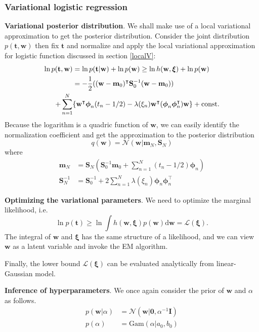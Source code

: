 \documentclass[a4paper]{report}
\newcommand{\ud}{\mathrm{d}}
\newcommand{\up}{\mathrm}
\renewcommand{\bf}{\mathbf}
\renewcommand{\cal}{\mathcal}
\newcommand{\bs}{\boldsymbol}
\begin{document}
\subsubsection{Variational logistic regression}
\textbf{Variational posterior distribution}. We shall make use of a local variational approximation to get the posterior distribution. Consider the joint distribution $p(\bf{t,w})$ then fix $\bf{t}$ and normalize and apply the local variational approximation for logistic function discussed in section \ref{localV}:
\begin{align}
	\ln p(\bf{t,w}) &= \ln p(\bf{t|w})+ \ln p(\bf{w}) \geq \ln h(\bf{w},\bs{\xi})+ \ln p(\bf{w}) \notag \\
	&= -\frac{1}{2}((\bf{w-m}_0)^{\intercal} \bf{S}_0^{-1} (\bf{w-m}_0)) \notag\\
	+\sum_{n=1}^N & \{ \bf{w}^{\intercal}\bs{\phi}_n (t_n-1/2)-\lambda(\xi_n)\bf{w}^{\intercal} (\bs{\phi}_n \bs{\phi}_n^{\intercal})\bf{w} \} +\up{const}.		
\end{align}
Because the logarithm is a quadric function of $\bf{w}$, we can easily identify the normalization coefficient and get the approximation to the posterior distribution
\begin{equation}
	q(\bf{w}) = \cal{N}(\bf{w}|\bf{m}_N,\bf{S}_N)
\end{equation}
where
\begin{align}
	\bf{m}_N &= \bf{S}_N \left( \bf{S}_0^{-1} \bf{m}_0 + \sum_{n=1}^N(t_n-1/2)\bs{\phi}_n \right)\\
	\bf{S}_N^{-1} &= \bf{S}_0^{-1} + 2\sum_{n=1}^N \lambda(\xi_n)\bs{\phi}_n \bs{\phi}_n^{\intercal}
\end{align}

\textbf{Optimizing the variational parameters}. We need to optimize the marginal likelihood, i.e.
\begin{equation}
	\ln p(\bf{t}) \geq \ln \int h(\bf{w},\bs{\xi})p(\bf{w})\ud \bf{w} = \cal{L}(\bs{\xi}).
\end{equation}
The integral of $\bf{w}$ and $\bs{\xi}$ has the same structure of a likelihood, and we can view $\bf{w}$ as a latent variable and invoke the EM algorithm.

Finally, the lower bound $\cal{L}(\bs{\xi})$ can be evaluated analytically from linear-Gaussian model.

\textbf{Inference of hyperparameters}. We once again consider the prior of $\bf{w}$ and $\alpha$ as follows.
\begin{align}
	p(\bf{w}|\alpha) &= \cal{N} (\bf{w}|\bf{0},\alpha^{-1}\bf{I}) \\
	p(\alpha) &= \up{Gam}(\alpha|a_0,b_0)
\end{align}
\end{document}
